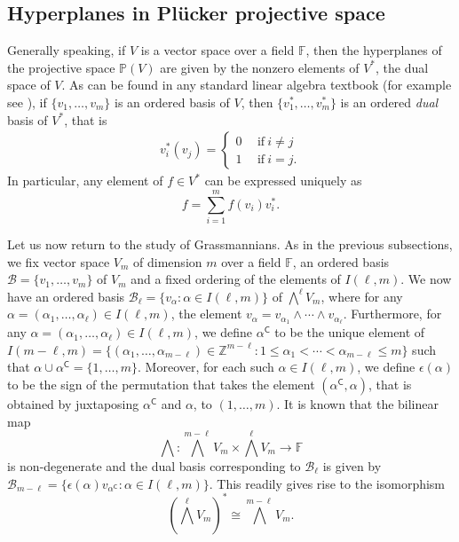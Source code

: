 \documentclass[10pt,a4paper,oneside]{amsproc}
\newcommand{\B}{\mathcal{B}}
\newcommand{\ZZ}{\mathbb{Z}}
\def\a{{\alpha}}
\def\FF{{\mathbb F}}
\def\PP{{\mathbb P}}
\begin{document}
\subsection{Hyperplanes in Pl\"ucker projective space}\label{sec:hyp}  Generally speaking, if $V$ is a vector space over a field $\FF$, then the hyperplanes of the projective space $\PP (V)$ are given by the nonzero elements of $V^*$, the dual space of $V$. As can be found in any standard linear algebra textbook (for example see \cite[Section 3.5]{HK}), if $\{v_1, \dots, v_m\}$ is an ordered basis of $V$, then $\{v_1^*, \dots, v_m^*\}$ is an ordered \textit{dual} basis of $V^*$, that is
\begin{align*}
    v_i^* (v_j) =
    \begin{cases}
        0 \ \ &\text{if} \ i \neq j \\
        1 \ \ &\text{if} \ i = j.
    \end{cases}
\end{align*}
In particular, any element of $f \in V^*$ can be expressed uniquely as 
\begin{equation}\label{dualformula}
f = \sum_{i=1}^m f(v_i) v_i^*.\end{equation}

Let us now return to the study of Grassmannians. As in the previous subsections, we fix  vector space $V_m$ of dimension $m$ over a field $\FF$, an ordered basis $\B = \{v_1, \dots, v_m\}$ of $V_m$ and a fixed ordering of the elements of $I(\ell, m)$. We now have an ordered basis $\B_\ell = \{v_\a : \a \in I(\ell, m)\}$  of $\bigwedge^\ell V_m$, where for any $\a = (\a_1, \dots, \a_\ell) \in I(\ell, m)$, the element $v_\a = v_{\a_1} \wedge \cdots \wedge v_{\a_\ell}$. Furthermore, for any $\a = (\a_1, \dots, \a_\ell) \in I(\ell, m)$, we define $\a^{\mathsf{C}}$ to be the unique element of $I(m - \ell, m) = \{(\a_1, \dots, \a_{m-\ell}) \in \ZZ^{m-\ell} : 1 \le \a_1 < \cdots < \a_{m - \ell} \le m\}$ such that $\a \cup \a^{\mathsf{C}} = \{1, \dots, m\}$. Moreover, for each such $\a \in I(\ell, m)$, we define $\epsilon (\a)$ to be the sign of the permutation that takes the element $(\a^{\mathsf{C}}, \a)$, that is obtained by juxtaposing $\a^{\mathsf{C}}$ and $\a$, to $(1, \dots, m)$. 
It is known that the bilinear map 
\begin{equation}\label{wedge}
    \bigwedge : \bigwedge^{m-\ell} V_m \times \bigwedge^{\ell} V_m \to \FF
\end{equation}
is non-degenerate and the dual basis corresponding to $\B_{\ell}$ is given by $\B_{m - \ell} = \{{\epsilon({\a})} v_{\a^{\mathsf{C}}} : \a \in I(\ell, m)\}$. This readily gives rise to the isomorphism
\begin{equation}\label{dual}
  \left(\bigwedge^\ell V_m\right)^* \cong \bigwedge^{m-\ell} V_m.
\end{equation}
\end{document}
